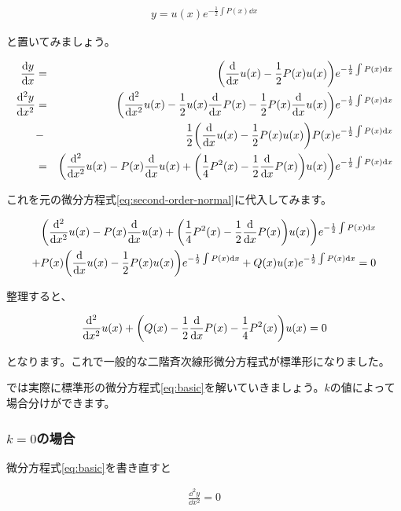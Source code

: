 \begin{eqnarray}
    y=u(x)e^{-\frac{1}{2}\int P(x)\dd x}
\end{eqnarray}

\noindent
と置いてみましょう。

\begin{eqnarray}
    \frac{\dd y}{\dd x}&=&\pqty{\frac{\dd}{\dd x}u(x)-\frac{1}{2}P(x)u(x)}e^{-\frac{1}{2}\int P(x)\dd x} \\
    \frac{\dd^2 y}{\dd x^2}&=&\pqty{\frac{\dd^2}{\dd x^2}u(x)-\frac{1}{2}u(x)\frac{\dd}{\dd x}P(x)-\frac{1}{2}P(x)\frac{\dd}{\dd x}u(x)}e^{-\frac{1}{2}\int P(x)\dd x} \nonumber \\
    &-&\frac{1}{2}\pqty{\frac{\dd}{\dd x}u(x)-\frac{1}{2}P(x)u(x)}P(x)e^{-\frac{1}{2}\int P(x)\dd x} \nonumber \\
    &=&\pqty{\frac{\dd^2}{\dd x^2}u(x)-P(x)\frac{\dd}{\dd x}u(x)+\pqty{\frac{1}{4}P^2(x)-\frac{1}{2}\frac{\dd}{\dd x}P(x)}u(x)}e^{-\frac{1}{2}\int P(x)\dd x}
\end{eqnarray}

これを元の微分方程式\ref{eq:second-order-normal}に代入してみます。

\begin{eqnarray}
    \pqty{\frac{\dd^2}{\dd x^2}u(x)-P(x)\frac{\dd}{\dd x}u(x)+\pqty{\frac{1}{4}P^2(x)-\frac{1}{2}\frac{\dd}{\dd x}P(x)}u(x)}e^{-\frac{1}{2}\int P(x)\dd x} \nonumber \\
    +P(x)\pqty{\frac{\dd}{\dd x}u(x)-\frac{1}{2}P(x)u(x)}e^{-\frac{1}{2}\int P(x)\dd x}+Q(x)u(x)e^{-\frac{1}{2}\int P(x)\dd x}=0
\end{eqnarray}

整理すると、

\begin{eqnarray}
    \frac{\dd^2}{\dd x^2}u(x)+\pqty{Q(x)-\frac{1}{2}\frac{\dd}{\dd x}P(x)-\frac{1}{4}P^2(x)}u(x)=0
\end{eqnarray}

\noindent
となります。これで一般的な二階斉次線形微分方程式が標準形になりました。

では実際に標準形の微分方程式\ref{eq:basic}を解いていきましょう。$k$の値によって場合分けができます。

\subsubsection{$k=0$の場合}
微分方程式\ref{eq:basic}を書き直すと

\begin{eqnarray}
    \frac{\dd^2y}{\dd x^2}=0
\end{eqnarray}

